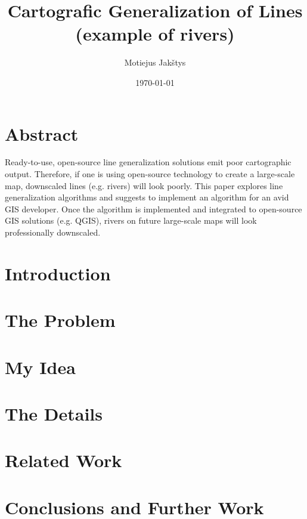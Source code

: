 \documentclass{article}
\title{
    Cartografic Generalization of Lines \\
    (example of rivers) \\ \vspace{4mm}
}
\author{Motiejus Jakštys}
\date{\today}
\begin{document}
\maketitle

\newpage

\section{Abstract}
\label{sec:abstract}

Ready-to-use, open-source line generalization solutions emit poor cartographic
output. Therefore, if one is using open-source technology to create a
large-scale map, downscaled lines (e.g. rivers) will look poorly. This paper
explores line generalization algorithms and suggests to implement an algorithm
for an avid GIS developer. Once the algorithm is implemented and integrated to
open-source GIS solutions (e.g. QGIS), rivers on future large-scale maps will
look professionally downscaled.

\section{Introduction}
\label{sec:introduction}

\section{The Problem}
\label{sec:the_problem}

\section{My Idea}
\label{sec:my_idea}

\section{The Details}
\label{sec:the_details}

\section{Related Work}
\label{sec:related_work}

\section{Conclusions and Further Work}
\label{sec:conclusions_and_further_work}

\printbibliography
\end{document}
